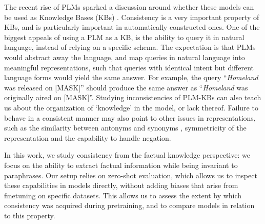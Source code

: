 The recent rise of PLMs sparked a discussion around whether these models can be used as Knowledge Bases (KBs) \cite{lama,petroni2020how,alpaqa,roberts2020much}. 
Consistency is a very important property of KBs, and is particularly important in automatically constructed ones.
One of the biggest appeals of using a PLM as a KB, is the ability to query it in natural language, instead of relying on a specific schema.
The expectation is that PLMs would abstract away the language, and map queries in natural language into meaningful representations, such that queries with identical intent but different language forms would yield the same answer. 
For example, the query ``\textit{Homeland} was released on [MASK]'' should produce the same answer as ``\textit{Homeland} was originally aired on [MASK]''.
Studying inconsistencies of PLM-KBs can also teach us about the organization of `knowledge' in the model, or lack thereof. 
Failure to behave in a consistent manner may also point to other issues in representations, 
such as the similarity between antonyms and synonyms \cite{nguyen2016integrating}, symmetricity of the representation and the capability to handle negation. 

In this work, we study consistency from the factual knowledge perspective: we focus on the ability to extract factual information while being invariant to paraphrases.
Our setup relies on zero-shot evaluation, which allows us to inspect these capabilities in models directly, without adding biases that arise from finetuning on specific datasets. This allows us to assess the extent by which consistency was acquired during pretraining, and to compare models in relation to this property. %


